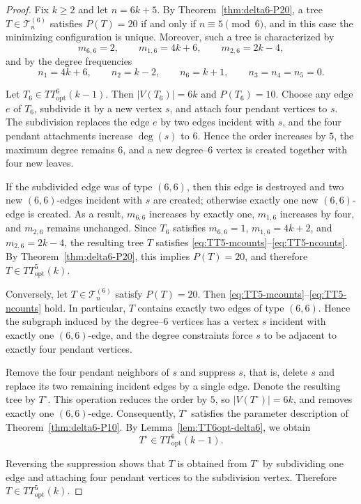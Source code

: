 \documentclass[preprint,12pt]{elsarticle}
\begin{document}
\begin{proof}
Fix $k\ge 2$ and let $n=6k+5$.
By Theorem~\ref{thm:delta6-P20}, a tree $T\in\mathcal{T}^{(6)}_n$ satisfies
$P(T)=20$ if and only if $n\equiv 5\pmod 6$, and in this case the minimizing
configuration is unique.
Moreover, such a tree is characterized by
\begin{equation}
m_{6,6}=2,\qquad
m_{1,6}=4k+6,\qquad
m_{2,6}=2k-4,
\label{eq:TT5-mcounts}
\end{equation}
and by the degree frequencies
\begin{equation}
n_1=4k+6,\qquad
n_2=k-2,\qquad
n_6=k+1,\qquad
n_3=n_4=n_5=0.
\label{eq:TT5-ncounts}
\end{equation}

Let $T_6\in TT^6_{\mathrm{opt}}(k-1)$.
Then $|V(T_6)|=6k$ and $P(T_6)=10$.
Choose any edge $e$ of $T_6$, subdivide it by a new vertex $s$, and attach four
pendant vertices to $s$.
The subdivision replaces the edge $e$ by two edges incident with $s$, and the
four pendant attachments increase $\deg(s)$ to $6$.
Hence the order increases by $5$, the maximum degree remains $6$, and a new
degree--$6$ vertex is created together with four new leaves.

If the subdivided edge was of type $(6,6)$, then this edge is destroyed and two
new $(6,6)$-edges incident with $s$ are created; otherwise exactly one new
$(6,6)$-edge is created.
As a result, $m_{6,6}$ increases by exactly one,
$m_{1,6}$ increases by four, and $m_{2,6}$ remains unchanged.
Since $T_6$ satisfies $m_{6,6}=1$, $m_{1,6}=4k+2$, and $m_{2,6}=2k-4$, the resulting
tree $T$ satisfies \eqref{eq:TT5-mcounts}--\eqref{eq:TT5-ncounts}.
By Theorem~\ref{thm:delta6-P20}, this implies $P(T)=20$, and therefore
$T\in TT^5_{\mathrm{opt}}(k)$.

Conversely, let $T\in\mathcal{T}^{(6)}_n$ satisfy $P(T)=20$.
Then \eqref{eq:TT5-mcounts}--\eqref{eq:TT5-ncounts} hold.
In particular, $T$ contains exactly two edges of type $(6,6)$.
Hence the subgraph induced by the degree--$6$ vertices has a vertex $s$ incident
with exactly one $(6,6)$-edge, and the degree constraints force $s$ to be adjacent
to exactly four pendant vertices.

Remove the four pendant neighbors of $s$ and suppress $s$, that is, delete $s$
and replace its two remaining incident edges by a single edge.
Denote the resulting tree by $T^\circ$.
This operation reduces the order by $5$, so $|V(T^\circ)|=6k$, and removes exactly
one $(6,6)$-edge.
Consequently, $T^\circ$ satisfies the parameter description of
Theorem~\ref{thm:delta6-P10}.
By Lemma~\ref{lem:TT6opt-delta6}, we obtain
\[
T^\circ \in TT^6_{\mathrm{opt}}(k-1).
\]

Reversing the suppression shows that $T$ is obtained from $T^\circ$ by subdividing
one edge and attaching four pendant vertices to the subdivision vertex.
Therefore $T\in TT^5_{\mathrm{opt}}(k)$.
\end{proof}
\end{document}
